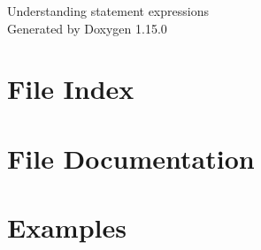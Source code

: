 \documentclass[twoside]{book}
\newcommand{\+}{\discretionary{\mbox{\scriptsize$\hookleftarrow$}}{}{}}
\newcommand{\clearemptydoublepage}{%
    \newpage{\pagestyle{empty}\cleardoublepage}%
  }
\begin{document}
  \raggedbottom
    \hypersetup{pageanchor=false,
                bookmarksnumbered=true,
                pdfencoding=unicode
               }
  \begin{titlepage}
  \vspace*{7cm}
  \begin{center}%
  {\Large Understanding statement expressions}\\
  \vspace*{1cm}
  {\large Generated by Doxygen 1.15.0}\\
  \end{center}
  \end{titlepage}
  \clearemptydoublepage
  \tableofcontents
  \clearemptydoublepage
  \hypersetup{pageanchor=true}
\chapter{File Index}

\chapter{File Documentation}






\chapter{Examples}

  \backmatter
  \newpage
  \clearemptydoublepage
  \printindex
\end{document}
